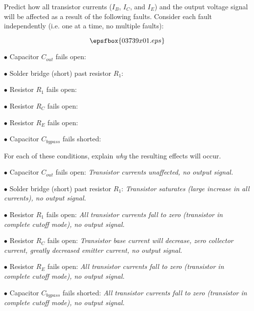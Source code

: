 

Predict how all transistor currents ($I_B$, $I_C$, and $I_E$) and the output voltage signal will be affected as a result of the following faults.  Consider each fault independently (i.e. one at a time, no multiple faults):

$$\epsfbox{03739x01.eps}$$

\medskip
\item{$\bullet$} Capacitor $C_{out}$ fails open:
\vskip 5pt
\item{$\bullet$} Solder bridge (short) past resistor $R_1$:
\vskip 5pt
\item{$\bullet$} Resistor $R_1$ fails open:
\vskip 5pt
\item{$\bullet$} Resistor $R_C$ fails open:
\vskip 5pt
\item{$\bullet$} Resistor $R_E$ fails open:
\vskip 5pt
\item{$\bullet$} Capacitor $C_{bypass}$ fails shorted:
\medskip

For each of these conditions, explain {\it why} the resulting effects will occur.







\medskip
\item{$\bullet$} Capacitor $C_{out}$ fails open: {\it Transistor currents unaffected, no output signal.}
\vskip 5pt
\item{$\bullet$} Solder bridge (short) past resistor $R_1$: {\it Transistor saturates (large increase in all currents), no output signal.}
\vskip 5pt
\item{$\bullet$} Resistor $R_1$ fails open: {\it All transistor currents fall to zero (transistor in complete cutoff mode), no output signal.}
\vskip 5pt
\item{$\bullet$} Resistor $R_C$ fails open: {\it Transistor base current will decrease, zero collector current, greatly decreased emitter current, no output signal.}
\vskip 5pt
\item{$\bullet$} Resistor $R_E$ fails open: {\it All transistor currents fall to zero (transistor in complete cutoff mode), no output signal.}
\vskip 5pt
\item{$\bullet$} Capacitor $C_{bypass}$ fails shorted: {\it All transistor currents fall to zero (transistor in complete cutoff mode), no output signal.}
\medskip

